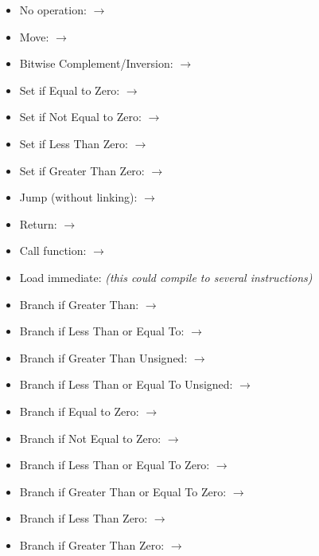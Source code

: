 \documentclass[11pt,pdftex,portrait,letterpaper]{article}
\begin{document}
\begin{itemize}
	\item No operation:  $\rightarrow$ 
	\item Move:  $\rightarrow$ 
	\item Bitwise Complement/Inversion:  $\rightarrow$ 
	\item Set if Equal to Zero:  $\rightarrow$ 
	\item Set if Not Equal to Zero:  $\rightarrow$ 
	\item Set if Less Than Zero:  $\rightarrow$ 
	\item Set if Greater Than Zero:  $\rightarrow$ 
	\item Jump (without linking):  $\rightarrow$ 
	\item Return:  $\rightarrow$ 
	\item Call function:  $\rightarrow$ 
	\item Load immediate:  \textit{(this could compile to several instructions)}
	\item Branch if Greater Than:  $\rightarrow$ 
	\item Branch if Less Than or Equal To:  $\rightarrow$ 
	\item Branch if Greater Than Unsigned:  $\rightarrow$ 
	\item Branch if Less Than or Equal To Unsigned:  $\rightarrow$ 
	\item Branch if Equal to Zero:  $\rightarrow$ 
	\item Branch if Not Equal to Zero:  $\rightarrow$ 
	\item Branch if Less Than or Equal To Zero:  $\rightarrow$ 
	\item Branch if Greater Than or Equal To Zero:  $\rightarrow$ 
	\item Branch if Less Than Zero:  $\rightarrow$ 
	\item Branch if Greater Than Zero:   $\rightarrow$ 
\end{itemize}
\end{document}
